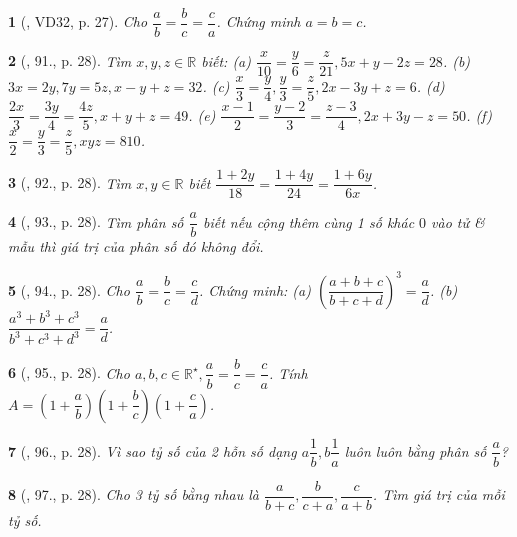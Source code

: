 \documentclass{article}
\newtheorem{baitoan}{}
\begin{document}
\begin{baitoan}[\cite{Binh_Toan_7_tap_1}, VD32, p. 27]
	Cho $\dfrac{a}{b} = \dfrac{b}{c} = \dfrac{c}{a}$. Chứng minh $a = b = c$.
\end{baitoan}

\begin{baitoan}[\cite{Binh_Toan_7_tap_1}, 91., p. 28]
	Tìm $x,y,z\in\mathbb{R}$ biết: (a) $\dfrac{x}{10} = \dfrac{y}{6} = \dfrac{z}{21},5x + y - 2z = 28$. (b) $3x = 2y,7y = 5z,x - y + z = 32$. (c) $\dfrac{x}{3} = \dfrac{y}{4},\dfrac{y}{3} = \dfrac{z}{5},2x - 3y + z = 6$. (d) $\dfrac{2x}{3} = \dfrac{3y}{4} = \dfrac{4z}{5},x + y + z = 49$. (e) $\dfrac{x - 1}{2} = \dfrac{y - 2}{3} = \dfrac{z - 3}{4},2x + 3y - z = 50$. (f) $\dfrac{x}{2} = \dfrac{y}{3} = \dfrac{z}{5},xyz = 810$.	
\end{baitoan}

\begin{baitoan}[\cite{Binh_Toan_7_tap_1}, 92., p. 28]
	Tìm $x,y\in\mathbb{R}$ biết $\dfrac{1 + 2y}{18} = \dfrac{1 + 4y}{24} = \dfrac{1 + 6y}{6x}$.
\end{baitoan}

\begin{baitoan}[\cite{Binh_Toan_7_tap_1}, 93., p. 28]
	Tìm phân số $\dfrac{a}{b}$ biết nếu cộng thêm cùng 1 số khác $0$ vào tử \& mẫu thì giá trị của phân số đó không đổi.
\end{baitoan}

\begin{baitoan}[\cite{Binh_Toan_7_tap_1}, 94., p. 28]
	Cho $\dfrac{a}{b} = \dfrac{b}{c} = \dfrac{c}{d}$. Chứng minh: (a) $\left(\dfrac{a + b + c}{b + c + d}\right)^3 = \dfrac{a}{d}$. (b) $\dfrac{a^3 + b^3 + c^3}{b^3 + c^3 + d^3} = \dfrac{a}{d}$.
\end{baitoan}

\begin{baitoan}[\cite{Binh_Toan_7_tap_1}, 95., p. 28]
	Cho $a,b,c\in\mathbb{R}^\star,\dfrac{a}{b} = \dfrac{b}{c} = \dfrac{c}{a}$. Tính $A = \left(1 + \dfrac{a}{b}\right)\left(1 + \dfrac{b}{c}\right)\left(1 + \dfrac{c}{a}\right)$.
\end{baitoan}

\begin{baitoan}[\cite{Binh_Toan_7_tap_1}, 96., p. 28]
	Vì sao tỷ số của 2 hỗn số dạng $a\dfrac{1}{b},b\dfrac{1}{a}$ luôn luôn bằng phân số $\dfrac{a}{b}$?
\end{baitoan}

\begin{baitoan}[\cite{Binh_Toan_7_tap_1}, 97., p. 28]
	Cho 3 tỷ số bằng nhau là $\dfrac{a}{b + c},\dfrac{b}{c + a},\dfrac{c}{a + b}$. Tìm giá trị của mỗi tỷ số.
\end{baitoan}
\end{document}
